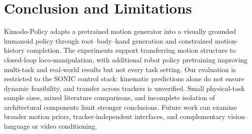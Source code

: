 \section{Conclusion and Limitations}
Kimodo-Policy adapts a pretrained motion generator into a visually grounded humanoid policy through root--body--hand generation and constrained motion-history completion. The experiments support transferring motion structure to closed-loop loco-manipulation, with additional robot policy pretraining improving multi-task and real-world results but not every task setting. Our evaluation is restricted to the SONIC control stack: kinematic predictions alone do not ensure dynamic feasibility, and transfer across trackers is unverified. Small physical-task sample sizes, mixed literature comparisons, and incomplete isolation of architectural components limit stronger conclusions. Future work can examine broader motion priors, tracker-independent interfaces, and complementary vision--language or video conditioning.
